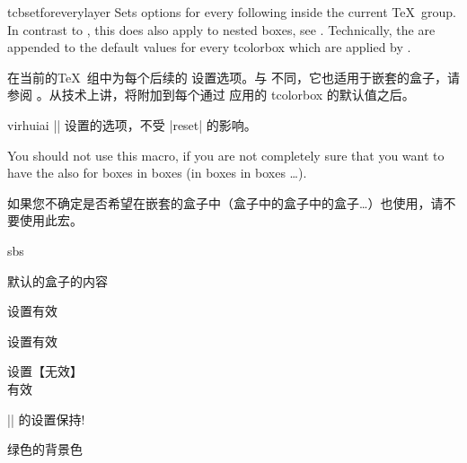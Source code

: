 \begin{docCommand}{tcbsetforeverylayer}{}
Sets options for every following  inside the current \TeX\ group.
In contrast to , this does also
apply to nested boxes, see .
Technically, the  are appended to the default values for every
tcolorbox which are applied by .


在当前的\TeX\ 组中为每个后续的 设置选项。与 不同，它也适用于嵌套的盒子，请参阅 。从技术上讲，将附加到每个通过  应用的 tcolorbox 的默认值之后。%

\begin{引述之言}{virhuiai}
|\tcbsetforeverylayer|%
设置的选项，不受 |reset| 的影响。
\end{引述之言}

You should not use this macro, if you are not completely sure that you
want to have the  also for boxes in boxes (in boxes in boxes \ldots).


如果您不确定是否希望在嵌套的盒子中（盒子中的盒子中的盒子\ldots）也使用，请不要使用此宏。
\begin{dispExample*}{sbs}
\begin{tcolorbox}[title=virhuiai家的盒子]
默认的盒子的内容
\end{tcolorbox}


\begin{tcolorbox}%
[title=外层的盒子]
设置有效\par
{}设置有效
\begin{tcolorbox}[title=嵌套的盒子]
设置【无效】\\
有效
\end{tcolorbox}
\end{tcolorbox}
\bigskip

\begin{tcolorbox}[reset,%
title={reset的盒子}]
|\tcbsetforeverylayer|%
的设置保持!
\end{tcolorbox}

\begin{tcolorbox}[title=默认的盒子]
绿色的背景色
\end{tcolorbox}
\end{dispExample*}
\end{docCommand}

